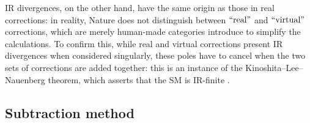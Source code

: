 IR divergences, on the other hand, have the same origin as those in real corrections: in reality, Nature does not distinguish between $ ``\text{real}" $ and $ ``\text{virtual}" $ corrections, which are merely human-made categories introduce to simplify the calculations. To confirm this, while real and virtual corrections present IR divergences when considered singularly, these poles have to cancel when the two sets of corrections are added together: this is an instance of the Kinoshita--Lee--Nauenberg theorem, which asserts that the SM is IR-finite \cite{Kinoshita-1962, Lee-1964}.

\subsection{Subtraction method}

